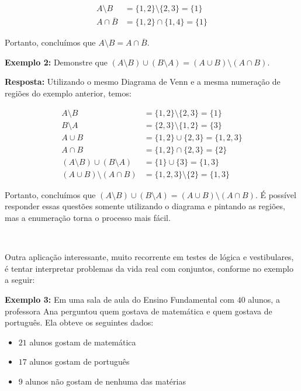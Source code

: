 \begin{equation*}
\begin{aligned}
  A \setminus B &= \{1,2\} \setminus \{2,3\} = \{1\}\\
  A \cap \overline B &= \{1,2\} \cap \{1,4\} = \{1\}
\end{aligned}
\end{equation*}

Portanto, concluímos que $A \setminus B = A \cap \overline B$.

\textbf{Exemplo 2:} Demonstre que $(A \setminus B) \cup (B \setminus A) = (A \cup B) \setminus (A \cap B)$.

\textbf{Resposta:} Utilizando o mesmo Diagrama de Venn e a mesma numeração de regiões do exemplo anterior, temos:

\begin{equation*}
\begin{aligned}
  A \setminus B &= \{1,2\} \setminus \{2,3\} = \{1\}\\
  B \setminus A &= \{2,3\} \setminus \{1,2\} = \{3\}\\
  A \cup B &= \{1,2\} \cup \{2,3\} = \{1,2,3\}\\
  A \cap B &= \{1,2\} \cap \{2,3\} = \{2\}\\
  (A \setminus B) \cup (B \setminus A) &= \{1\} \cup \{3\} = \{1,3\}\\
  (A \cup B) \setminus (A \cap B) &= \{1,2,3\} \setminus \{2\} = \{1,3\}
\end{aligned}
\end{equation*}

Portanto, concluímos que $(A \setminus B) \cup (B \setminus A) = (A \cup B) \setminus (A \cap B)$.
\newline
É possível responder essas questões somente utilizando o diagrama e pintando as regiões, mas a enumeração torna o processo mais fácil.

$\qquad$

Outra aplicação interessante, muito recorrente em testes de lógica e vestibulares, é tentar interpretar problemas da vida real com conjuntos, conforme no exemplo a seguir:

\textbf{Exemplo 3:} Em uma sala de aula do Ensino Fundamental com $40$ alunos, a professora Ana perguntou quem gostava de matemática e quem gostava de português. Ela obteve os seguintes dados:

\begin{itemize}
\item $21$ alunos gostam de matemática
\item $17$ alunos gostam de português
\item $9$ alunos não gostam de nenhuma das matérias
\end{itemize}

